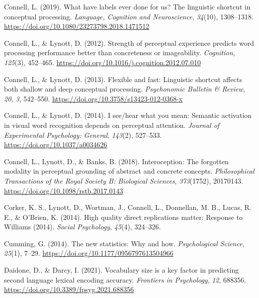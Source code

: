 \documentclass[
  12pt,
  man,floatsintext]{apa7}
\newlength{\cslhangindent}
\newlength{\cslentryspacingunit} %
\newenvironment{CSLReferences}[2] %
 {%
  \setlength{\parindent}{0pt}
  \ifodd #1
  \let\oldpar\par
  \def\par{\hangindent=\cslhangindent\oldpar}
  \fi
  \setlength{\parskip}{#2\cslentryspacingunit}
 }%
 {}
\begin{document}
\begin{CSLReferences}{1}{0}
\leavevmode{}%
Connell, L. (2019). What have labels ever done for us? {The} linguistic shortcut in conceptual processing. \emph{Language, Cognition and Neuroscience}, \emph{34}(10), 1308--1318. \url{https://doi.org/10.1080/23273798.2018.1471512}

\leavevmode{}%
Connell, L., \& Lynott, D. (2012). Strength of perceptual experience predicts word processing performance better than concreteness or imageability. \emph{Cognition}, \emph{125}(3), 452--465. \url{https://doi.org/10.1016/j.cognition.2012.07.010}

\leavevmode{}%
Connell, L., \& Lynott, D. (2013). Flexible and fast: {Linguistic} shortcut affects both shallow and deep conceptual processing. \emph{Psychonomic Bulletin \& Review}, \emph{20, 3}, 542--550. \url{https://doi.org/10.3758/s13423-012-0368-x}

\leavevmode{}%
Connell, L., \& Lynott, D. (2014). I see/hear what you mean: {Semantic} activation in visual word recognition depends on perceptual attention. \emph{Journal of Experimental Psychology: General}, \emph{143}(2), 527--533. \url{https://doi.org/10.1037/a0034626}

\leavevmode{}%
Connell, L., Lynott, D., \& Banks, B. (2018). Interoception: The forgotten modality in perceptual grounding of abstract and concrete concepts. \emph{Philosophical Transactions of the Royal Society B: Biological Sciences}, \emph{373}(1752), 20170143. \url{https://doi.org/10.1098/rstb.2017.0143}

\leavevmode{}%
Corker, K. S., Lynott, D., Wortman, J., Connell, L., Donnellan, M. B., Lucas, R. E., \& O'Brien, K. (2014). High quality direct replications matter: {Response} to {Williams} (2014). \emph{Social Psychology}, \emph{45}(4), 324--326.

\leavevmode{}%
Cumming, G. (2014). The new statistics: {Why} and how. \emph{Psychological Science}, \emph{25}(1), 7--29. \url{https://doi.org/10.1177/0956797613504966}

\leavevmode{}%
Daidone, D., \& Darcy, I. (2021). Vocabulary size is a key factor in predicting second language lexical encoding accuracy. \emph{Frontiers in Psychology}, \emph{12}, 688356. \url{https://doi.org/10.3389/fpsyg.2021.688356}


\end{CSLReferences}
\end{document}

